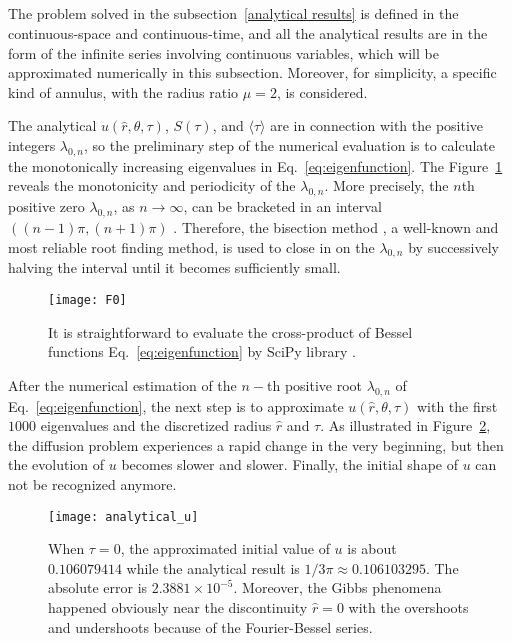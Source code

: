 \subsection{}\label{numerical approximation}

The problem solved in the subsection~\ref{analytical results} is
defined in the continuous-space and continuous-time, and all the
analytical results are in the form of the infinite series involving
continuous variables, which will be approximated numerically in this
subsection. Moreover, for simplicity, a specific kind of annulus, with
the radius ratio $\mu=2$, is considered.

The analytical $u(\hat r, \theta, \tau)$, $S(\tau)$, and
$\langle \tau \rangle$ are in connection with the positive integers
$\lambda_{0,n}$, so the preliminary step of the numerical evaluation
is to calculate the monotonically increasing eigenvalues in
Eq.~\ref{eq:eigenfunction}.  The Figure~\ref{fig:F0} reveals the
monotonicity and periodicity of the $\lambda_{0,n}$. More precisely,
the $n$th positive zero $\lambda_{0,n}$, as $n \rightarrow \infty $,
can be bracketed in an interval $((n-1) \pi,
(n+1) \pi)$ \cite{NIST:DLMF}. Therefore, the bisection
method \cite{2020SciPy-NMeth}, a well-known and most reliable root
finding method, is used to close in on the $\lambda_{0,n}$ by
successively halving the interval until it becomes sufficiently small.

\begin{figure}
\centering
\texttt{[image: F0]}
\caption{It is straightforward to evaluate the cross-product of
Bessel functions Eq.~\ref{eq:eigenfunction} by SciPy
library \cite{2020SciPy-NMeth}. \label{fig:F0}}
\end{figure}


After the numerical estimation of the $n-$th positive root
$\lambda_{0,n}$ of Eq.~\ref{eq:eigenfunction}, the next step is to
approximate $u(\hat r, \theta, \tau)$ with the first $1000$
eigenvalues and the discretized radius $\hat r$ and $\tau$. As
illustrated in Figure~\ref{fig:u}, the diffusion problem experiences a
rapid change in the very beginning, but then the evolution of $u$
becomes slower and slower. Finally, the initial shape of $u$ can not
be recognized anymore.

\begin{figure}
\centering
\texttt{[image: analytical\_u]}
\caption{When $\tau=0$, the approximated initial value of $u$ is about $0.106079414$ while the analytical result is $1/3\pi \approx 0.106103295$. The absolute error is $2.3881 \times 10^{-5}$. Moreover, the Gibbs phenomena \cite{fay2003gibbs} happened obviously near the discontinuity $\hat r = 0$ with the overshoots and undershoots because of the Fourier-Bessel series. \label{fig:u}}
\end{figure}

